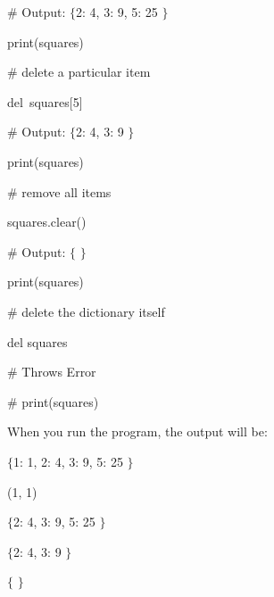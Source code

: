 \vspace{12pt}
\noindent 
 \hspace*{0.5in}  $  \#  $ Output:  $  \{  $2: 4, 3: 9, 5: 25 $  \}  $ \par
\noindent 
 \hspace*{0.5in} print(squares) \par
\vspace{12pt}
\noindent 
 \hspace*{0.5in}  $  \#  $ delete a particular item \par
\noindent 
 \hspace*{0.5in} del~squares[5]   \par
\vspace{12pt}
\noindent 
 \hspace*{0.5in}  $  \#  $ Output:  $  \{  $2: 4, 3: 9 $  \}  $ \par
\noindent 
 \hspace*{0.5in} print(squares) \par
\vspace{12pt}
\noindent 
 \hspace*{0.5in}  $  \#  $ remove all items \par
\noindent 
 \hspace*{0.5in} squares.clear() \par
\vspace{12pt}
\noindent 
 \hspace*{0.5in}  $  \#  $ Output:  $  \{  $ $  \}  $ \par
\noindent 
 \hspace*{0.5in} print(squares) \par
\vspace{12pt}
\noindent 
 \hspace*{0.5in}  $  \#  $ delete the dictionary itself \par
\noindent 
 \hspace*{0.5in} del squares \par
\vspace{12pt}
\noindent 
 \hspace*{0.5in}  $  \#  $ Throws Error \par
\noindent 
 \hspace*{0.5in}  $  \#  $ print(squares) \par
\noindent 
When you run the program, the output will be: \par
\noindent 
{\fontsize{11pt}{11pt}} \par
\noindent 
{\fontsize{11pt}{11pt}\selectfont  $  \{  $1: 1, 2: 4, 3: 9, 5: 25 $  \}  $} \par
\noindent 
{\fontsize{11pt}{11pt}\selectfont (1, 1)} \par
\noindent 
{\fontsize{11pt}{11pt}\selectfont  $  \{  $2: 4, 3: 9, 5: 25 $  \}  $} \par
\noindent 
{\fontsize{11pt}{11pt}\selectfont  $  \{  $2: 4, 3: 9 $  \}  $} \par
\noindent 
{\fontsize{11pt}{11pt}\selectfont  $  \{  $ $  \}  $} \par

